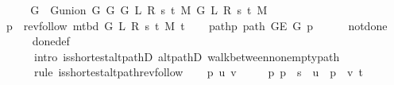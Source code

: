 \begin{isabellebody}
\isanewline
%
\endisadeliminvisible
%
\isadelimproof
%
\endisadelimproof
%
\isatagproof
{}\isamarkupfalse%
\ {\isacharminus}{\kern0pt}\isanewline
\ \ \isamarkupfalse%
\ {\isacharquery}{\kern0pt}G\ {\isacharequal}{\kern0pt}\ {\isachardoublequoteopen}G{\isachardot}{\kern0pt}union\ {\isacharparenleft}{\kern0pt}G{}\ G\ {\isacharparenleft}{\kern0pt}G{}\ L\ R\ s\ t\ M{\isacharparenright}{\kern0pt}{\isacharparenright}{\kern0pt}\ {\isacharparenleft}{\kern0pt}G{}\ L\ R\ s\ t\ M{\isacharparenright}{\kern0pt}{\isachardoublequoteclose}\isanewline
\ \ \isamarkupfalse%
\ {\isacharquery}{\kern0pt}p\ {\isacharequal}{\kern0pt}\ {\isachardoublequoteopen}rev{\isacharunderscore}{\kern0pt}follow\ {\isacharparenleft}{\kern0pt}m{\isacharunderscore}{\kern0pt}tbd\ G\ L\ R\ s\ t\ M{\isacharparenright}{\kern0pt}\ t{\isachardoublequoteclose}\isanewline
\ \ \isamarkupfalse%
\ path{\isacharunderscore}{\kern0pt}p{\isacharcolon}{\kern0pt}\ {\isachardoublequoteopen}path\ {\isacharparenleft}{\kern0pt}G{\isachardot}{\kern0pt}E\ {\isacharquery}{\kern0pt}G{\isacharparenright}{\kern0pt}\ {\isacharquery}{\kern0pt}p{\isachardoublequoteclose}\isanewline
\ \ \ \ \isamarkupfalse%
\ not{\isacharunderscore}{\kern0pt}done{\isacharunderscore}{\kern0pt}{}\isanewline
\ \ \ \ \isamarkupfalse%
\ done{\isacharunderscore}{\kern0pt}{}{\isacharunderscore}{\kern0pt}def\isanewline
\ \ \ \ \isamarkupfalse%
\isanewline
\ \ \ \ \ \ {\isacharparenleft}{\kern0pt}intro\ is{\isacharunderscore}{\kern0pt}shortest{\isacharunderscore}{\kern0pt}alt{\isacharunderscore}{\kern0pt}pathD{\isacharparenleft}{\kern0pt}{}{\isacharparenright}{\kern0pt}\ alt{\isacharunderscore}{\kern0pt}pathD{\isacharparenleft}{\kern0pt}{}{\isacharparenright}{\kern0pt}\ walk{\isacharunderscore}{\kern0pt}between{\isacharunderscore}{\kern0pt}nonempty{\isacharunderscore}{\kern0pt}path{\isacharparenleft}{\kern0pt}{}{\isacharparenright}{\kern0pt}{\isacharparenright}{\kern0pt}\isanewline
\ \ \ \ \ \ {\isacharparenleft}{\kern0pt}rule\ is{\isacharunderscore}{\kern0pt}shortest{\isacharunderscore}{\kern0pt}alt{\isacharunderscore}{\kern0pt}path{\isacharunderscore}{\kern0pt}rev{\isacharunderscore}{\kern0pt}follow{\isacharparenright}{\kern0pt}\isanewline
\ \ \isamarkupfalse%
\ p\ u\ v\ \isanewline
\ \ \ \ p{\isacharcolon}{\kern0pt}\ {\isachardoublequoteopen}{\isacharquery}{\kern0pt}p\ {\isacharequal}{\kern0pt}\ s\ {\isacharhash}{\kern0pt}\ u\ {\isacharhash}{\kern0pt}\ p\ {\isacharat}{\kern0pt}\ {\isacharbrackleft}{\kern0pt}v{\isacharcomma}{\kern0pt}\ t{\isacharbrackright}{\kern0pt}{\isachardoublequoteclose}\isanewline

\end{isabellebody}

